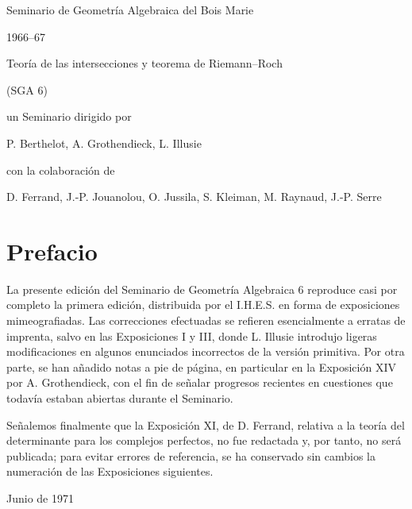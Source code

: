\documentclass[11pt]{article}
\begin{document}
\begin{center}
{\Large Seminario de Geometría Algebraica del Bois Marie}\par
{\large 1966--67}\par
\vspace{1.5em}
{\Large Teoría de las intersecciones y teorema de Riemann--Roch}\par
{\large (SGA 6)}\par
\vspace{1.5em}
un Seminario dirigido por\par
P. Berthelot, A. Grothendieck, L. Illusie\par
con la colaboración de\par
D. Ferrand, J.-P. Jouanolou, O. Jussila, S. Kleiman, M. Raynaud, J.-P. Serre
\end{center}

\section*{Prefacio}
La presente edición del Seminario de Geometría Algebraica 6 reproduce casi
por completo la primera edición, distribuida por el I.H.E.S. en forma de
exposiciones mimeografiadas. Las correcciones efectuadas se refieren
esencialmente a erratas de imprenta, salvo en las Exposiciones I y III, donde
L. Illusie introdujo ligeras modificaciones en algunos enunciados incorrectos
de la versión primitiva. Por otra parte, se han añadido notas a pie de página,
en particular en la Exposición XIV por A. Grothendieck, con el fin de señalar
progresos recientes en cuestiones que todavía estaban abiertas durante el
Seminario.

Señalemos finalmente que la Exposición XI, de D. Ferrand, relativa a la teoría
del determinante para los complejos perfectos, no fue redactada y, por tanto,
no será publicada; para evitar errores de referencia, se ha conservado sin
cambios la numeración de las Exposiciones siguientes.

\begin{flushright}Junio de 1971\end{flushright}
\end{document}
